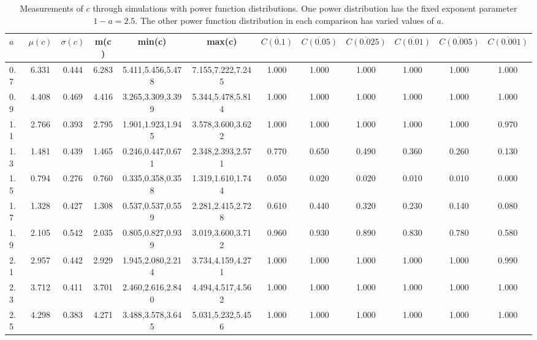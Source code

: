 \begin{table*}[h!]
\begin{center}
\begin{tabular}{| l | c | c | c | c | c | c | c | c | c | c | c |}\hline
$a$ & $\mu(c)$ & $\sigma(c)$ & m(c) & min(c) & max(c) & $\overline{C(0.1)}$ & $\overline{C(0.05)}$ & $\overline{C(0.025)}$ & $\overline{C(0.01)}$ & $\overline{C(0.005)}$ & $\overline{C(0.001)}$ \\\hline
0.7 & 6.331 & 0.444 & 6.283 & 5.411,5.456,5.478 & 7.155,7.222,7.245  & 1.000  & 1.000  & 1.000  & 1.000  & 1.000  & 1.000 \\\hline
0.9 & 4.408 & 0.469 & 4.416 & 3.265,3.309,3.399 & 5.344,5.478,5.814  & 1.000  & 1.000  & 1.000  & 1.000  & 1.000  & 1.000 \\\hline
1.1 & 2.766 & 0.393 & 2.795 & 1.901,1.923,1.945 & 3.578,3.600,3.622  & 1.000  & 1.000  & 1.000  & 1.000  & 1.000  & 0.970 \\\hline
1.3 & 1.481 & 0.439 & 1.465 & 0.246,0.447,0.671 & 2.348,2.393,2.571  & 0.770  & 0.650  & 0.490  & 0.360  & 0.260  & 0.130 \\\hline
1.5 & 0.794 & 0.276 & 0.760 & 0.335,0.358,0.358 & 1.319,1.610,1.744  & 0.050  & 0.020  & 0.020  & 0.010  & 0.010  & 0.000 \\\hline
1.7 & 1.328 & 0.427 & 1.308 & 0.537,0.537,0.559 & 2.281,2.415,2.728  & 0.610  & 0.440  & 0.320  & 0.230  & 0.140  & 0.080 \\\hline
1.9 & 2.105 & 0.542 & 2.035 & 0.805,0.827,0.939 & 3.019,3.600,3.712  & 0.960  & 0.930  & 0.890  & 0.830  & 0.780  & 0.580 \\\hline
2.1 & 2.957 & 0.442 & 2.929 & 1.945,2.080,2.214 & 3.734,4.159,4.271  & 1.000  & 1.000  & 1.000  & 1.000  & 1.000  & 0.990 \\\hline
2.3 & 3.712 & 0.411 & 3.701 & 2.460,2.616,2.840 & 4.494,4.517,4.562  & 1.000  & 1.000  & 1.000  & 1.000  & 1.000  & 1.000 \\\hline
2.5 & 4.298 & 0.383 & 4.271 & 3.488,3.578,3.645 & 5.031,5.232,5.456  & 1.000  & 1.000  & 1.000  & 1.000  & 1.000  & 1.000 \\\hline
\end{tabular}
\caption{Measurements of $c$ through simulations
with power function distributions.
One power distribution has the fixed exponent parameter $1-a=2.5$.
The other power function distribution in each comparison
has varied values of $a$.}
\end{center}
\end{table*}